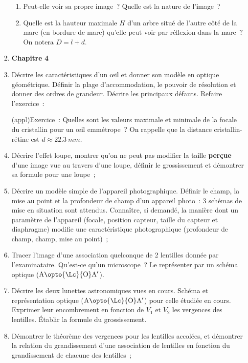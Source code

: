 \documentclass[a4paper, 12pt, final, garamond]{book}
\begin{document}
\begin{enumerate}
\begin{tcb}
		      \begin{enumerate}
			      \item Peut-elle voir sa propre image~? Quelle est la nature de
			            l'image~?
			      \item Quelle est la hauteur maximale $H$ d'un arbre situé de l'autre
			            côté de la mare (en bordure de mare) qu'elle peut voir par
			            réflexion dans la mare~? On notera $D = l+d$.
		      \end{enumerate}
	      \end{tcb}
	\item[] \textbf{Chapitre 4}
	\item Décrire les caractéristiques d'un œil et donner son modèle en optique
	      géométrique. Définir la plage d'accommodation, le pouvoir de résolution
	      et donner des ordres de grandeur. Décrire les principaux défauts.
	      Refaire l'exercice~:
	      \begin{tcb}(appl){Exercice~:}
		      Quelles sont les valeurs maximale et minimale de la focale du
		      cristallin pour un œil emmétrope~? On rappelle que la distance
		      cristallin-rétine est $d \approx \SI{22.3}{mm}$.
	      \end{tcb}
	\item Décrire l'effet loupe, montrer qu'on ne peut pas modifier la taille
	      \textbf{perçue} d'une image vue au travers d'une loupe, définir le
	      grossissement et démontrer sa formule pour une loupe~;
	\item Décrire un modèle simple de l'appareil photographique. Définir le
	      champ, la mise au point et la profondeur de champ d'un appareil photo~:
	      3 schémas de mise en situation sont attendus. Connaître, si demandé, la
	      manière dont un paramètre de l'appareil (focale, position capteur,
	      taille du capteur et diaphragme) modifie une caractéristique
	      photographique (profondeur de champ, champ, mise au point)~;
	\item Tracer l'image d'une association quelconque de 2 lentilles donnée par
	      l'examinataire. Qu'est-ce qu'un microscope~? Le représenter par un schéma
	      optique ($\rm A \opto{\Lc}{\rm O} A'$).
	\item Décrire les deux lunettes astronomiques vues en cours. Schéma et
	      représentation optique ($\rm A \opto{\Lc}{\rm O} A'$) pour celle étudiée
	      en cours. Exprimer leur encombrement en fonction de $V_1$ et $V_2$ les
	      vergences des lentilles. Établir la formule du grossissement.
	\item Démontrer le théorème des vergences pour les lentilles accolées, et
	      démontrer la relation du grandissement d'une association de lentilles en
	      fonction du grandissement de chacune des lentilles~;
\end{enumerate}
\end{document}
